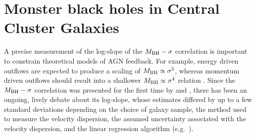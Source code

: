 \chapter{Monster black holes in Central Cluster Galaxies}
\label{ch:msigma}

A precise measurement of the log-slope of the $M_{\rm BH} - \sigma$ correlation is important 
to constrain theoretical models of AGN feedback. 
For example, energy driven outflows are expected to produce a scaling of $M_{\rm BH} \propto \sigma^5$, 
whereas momentum driven outflows should result into a shallower $M_{\rm BH} \propto \sigma^4$ relation 
\citep{silkrees1998,fabian1999}. 
Since the $M_{\rm BH} - \sigma$ correlation was presented for the first time by \citet{ferraresemerritt2000}
and \citet{gebhardt2000}, 
there has been an ongoing, lively debate about its log-slope, 
whose estimates differed by up to a few standard deviations 
depending on the choice of galaxy sample, the method used to measure the velocity dispersion,
the assumed uncertainty associated with the velocity dispersion, 
and the linear regression algorithm (e.g.~\citealt{tremaine2002}). \\ 

